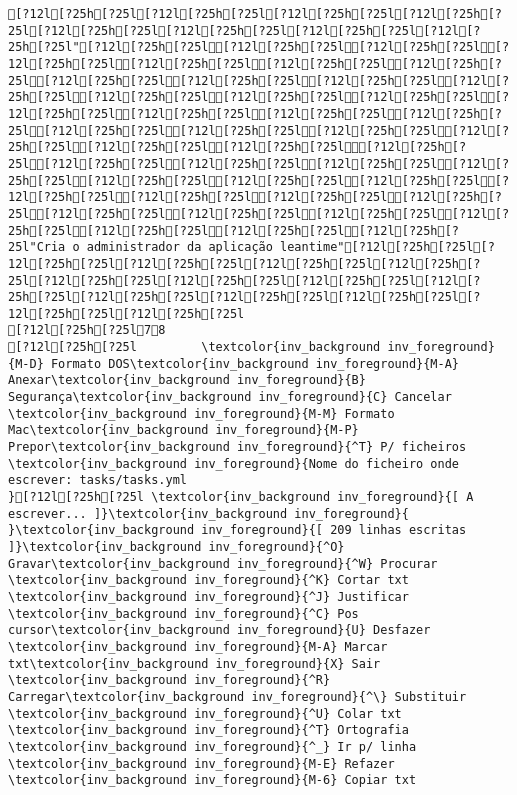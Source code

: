 \documentclass{scrartcl}
\begin{document}
\begin{Verbatim}
[?12l[?25h[?25l[?12l[?25h[?25l[?12l[?25h[?25l[?12l[?25h[?25l[?12l[?25h[?25l[?12l[?25h[?25l[?12l[?25h[?25l[?12l[?25h[?25l"[?12l[?25h[?25l[?12l[?25h[?25l[?12l[?25h[?25l[?12l[?25h[?25l[?12l[?25h[?25l[?12l[?25h[?25l[?12l[?25h[?25l[?12l[?25h[?25l[?12l[?25h[?25l[?12l[?25h[?25l[?12l[?25h[?25l[?12l[?25h[?25l[?12l[?25h[?25l[?12l[?25h[?25l[?12l[?25h[?25l[?12l[?25h[?25l[?12l[?25h[?25l[?12l[?25h[?25l[?12l[?25h[?25l[?12l[?25h[?25l[?12l[?25h[?25l[?12l[?25h[?25l[?12l[?25h[?25l[?12l[?25h[?25l[?12l[?25h[?25l[?12l[?25h[?25l[?12l[?25h[?25l[?12l[?25h[?25l[?12l[?25h[?25l[?12l[?25h[?25l[?12l[?25h[?25l[?12l[?25h[?25l[?12l[?25h[?25l[?12l[?25h[?25l[?12l[?25h[?25l[?12l[?25h[?25l[?12l[?25h[?25l[?12l[?25h[?25l[?12l[?25h[?25l[?12l[?25h[?25l[?12l[?25h[?25l[?12l[?25h[?25l[?12l[?25h[?25l"Cria o administrador da aplicação leantime"[?12l[?25h[?25l[?12l[?25h[?25l[?12l[?25h[?25l[?12l[?25h[?25l[?12l[?25h[?25l[?12l[?25h[?25l[?12l[?25h[?25l[?12l[?25h[?25l[?12l[?25h[?25l[?12l[?25h[?25l[?12l[?25h[?25l[?12l[?25h[?25l[?12l[?25h[?25l[?12l[?25h[?25l
[?12l[?25h[?25l78
[?12l[?25h[?25l         \textcolor{inv_background inv_foreground}{M-D} Formato DOS\textcolor{inv_background inv_foreground}{M-A} Anexar\textcolor{inv_background inv_foreground}{B} Segurança\textcolor{inv_background inv_foreground}{C} Cancelar           \textcolor{inv_background inv_foreground}{M-M} Formato Mac\textcolor{inv_background inv_foreground}{M-P} Prepor\textcolor{inv_background inv_foreground}{^T} P/ ficheiros
\textcolor{inv_background inv_foreground}{Nome do ficheiro onde escrever: tasks/tasks.yml                                                                                           }[?12l[?25h[?25l \textcolor{inv_background inv_foreground}{[ A escrever... ]}\textcolor{inv_background inv_foreground}{          }\textcolor{inv_background inv_foreground}{[ 209 linhas escritas ]}\textcolor{inv_background inv_foreground}{^O} Gravar\textcolor{inv_background inv_foreground}{^W} Procurar      \textcolor{inv_background inv_foreground}{^K} Cortar txt    \textcolor{inv_background inv_foreground}{^J} Justificar    \textcolor{inv_background inv_foreground}{^C} Pos cursor\textcolor{inv_background inv_foreground}{U} Desfazer     \textcolor{inv_background inv_foreground}{M-A} Marcar txt\textcolor{inv_background inv_foreground}{X} Sair    \textcolor{inv_background inv_foreground}{^R} Carregar\textcolor{inv_background inv_foreground}{^\} Substituir    \textcolor{inv_background inv_foreground}{^U} Colar txt     \textcolor{inv_background inv_foreground}{^T} Ortografia    \textcolor{inv_background inv_foreground}{^_} Ir p/ linha   \textcolor{inv_background inv_foreground}{M-E} Refazer      \textcolor{inv_background inv_foreground}{M-6} Copiar txt

\end{Verbatim}
\end{document}
